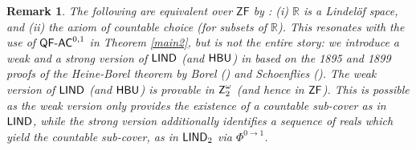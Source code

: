 \documentclass[reqno]{amsart}
\newcommand{\Z}{{\textsf{\textup{Z}}}}
\newtheorem{rem}[thm]{Remark}
\def\ZF{\textup{\textsf{ZF}}}
\def\R{{\mathbb  R}}
\def\di{\rightarrow}
\def\QFAC{\textup{\textsf{QF-AC}}}
\def\HBU{\textup{\textsf{HBU}}}
\def\LIND{\textup{\textsf{LIND}}}
\numberwithin{equation}{section}
\numberwithin{thm}{section}
\begin{document}
\begin{rem}\label{linpinpon} \rm 
The following are equivalent over $\textsf{ZF}$ by \cite{heerlijk}: (i) $\R$ is a Lindel\"of space, and (ii) the axiom of countable choice (for subsets of $\R$).  
This resonates with the use of $\QFAC^{0,1}$ in Theorem \ref{main2}, but is not the entire story: we introduce a weak and a strong version of $\LIND$ (and $\HBU$) in \cite{dagsamV} based on the 1895 and 1899 proofs of the Heine-Borel theorem by Borel (\cite{opborrelen}) and Schoenflies (\cite{schoen2}).  The \emph{weak} version of $\LIND$ (and $\HBU$) is provable in $\Z_{2}^{\omega}$ (and hence in $\ZF$).  This is possible as the weak version only provides the \emph{existence} of a countable sub-cover as in $\LIND$, while the strong version \emph{additionally} identifies a sequence of reals which yield the countable sub-cover, as in $\LIND_{2}$ via $\Phi^{0\di 1}$. 
\end{rem}
  
  
\end{document}
